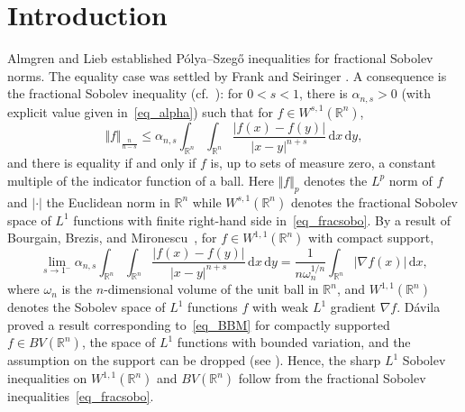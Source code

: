\documentclass{amsart}
\newcommand{\dvtex}{\,\mathrm{d}}
\begin{document}
\maketitle




\section{Introduction}

Almgren and Lieb \cite{AlmgrenLieb} established P\'olya--Szeg\H o inequalities
for fractional Sobolev norms. The equality case was settled by Frank and
Seiringer \cite{FrankSeiringer}. A consequence is the fractional Sobolev
inequality (cf.~\cite{Ludwig:fracperi,FrankSeiringer}): for $0<s<1$, there
is $\alpha _{n,s}>0$ (with explicit value given in~\eqref{eq_alpha}) such
that for $f\in W^{s,1}(\mathbb R^{n})$,
%
\begin{equation}
\label{eq_fracsobo}
\Vert f\Vert _{{\frac {n}{n-s}}} \le \alpha _{n,s}\int _{\mathbb R^{n}}
\int _{\mathbb R^{n}}
\frac{\vert f(x)-f(y)\vert}{\vert x-y \vert ^{n+s}}\dvtex x\dvtex y,
\end{equation}
%
and there is equality if and only if $f$ is, up to sets of measure zero,
a constant multiple of the indicator function of a ball. Here
$\Vert f\Vert _{p}$ denotes the $L^{p}$ norm of $f$ and
$\vert \cdot \vert $ the Euclidean norm in $\mathbb R^{n}$ while
$W^{s,1}(\mathbb R^{n})$ denotes the fractional Sobolev space of
$L^{1}$ functions with finite right-hand side in~\eqref{eq_fracsobo}. By
a result of Bourgain, Brezis, and Mironescu~\cite{BourgainBrezisMironescu},
for $f\in W^{1,1}(\mathbb R^{n})$ with compact support,
%
\begin{equation}
\label{eq_BBM}
\lim _{s\to 1^{-}} \alpha _{n,s}\int _{\mathbb R^{n}} \int _{
\mathbb R^{n}} \frac{\vert f(x)-f(y)\vert}{\vert x-y \vert ^{n+s}}\dvtex x
\dvtex y = \frac {1}{n\omega _{n}^{1/n}}\int _{\mathbb R^{n}} \vert
\nabla f(x)\vert \dvtex x,
\end{equation}
%
where $\omega _{n}$ is the $n$-dimensional volume of the unit ball in
$\mathbb R^{n}$, and $W^{1,1}(\mathbb R^{n})$ denotes the Sobolev space
of $L^{1}$ functions $f$ with weak $L^{1}$ gradient $\nabla f$. D\'avila~\cite{Davila}
proved a result corresponding to~\eqref{eq_BBM} for compactly supported
$f\in BV(\mathbb R^{n})$, the space of $L^{1}$ functions with bounded variation,
and the assumption on the support can be dropped (see
\cite[Theorem 1.4]{AlbericoCianchiPickSlavikov}). Hence, the sharp
$L^{1}$ Sobolev inequalities on $W^{1,1}(\mathbb R^{n})$ and
$BV(\mathbb R^{n})$ follow from the fractional Sobolev inequalities~\eqref{eq_fracsobo}.
\end{document}
